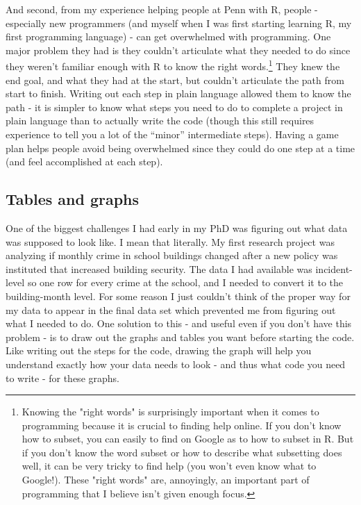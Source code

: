 \documentclass[
]{krantz}
\begin{document}
And second, from my experience helping people at Penn with R, people - especially new programmers (and myself when I was first starting learning R, my first programming language) - can get overwhelmed with programming. One major problem they had is they couldn't articulate what they needed to do since they weren't familiar enough with R to know the right words.\footnote{Knowing the "right words" is surprisingly important when it comes to programming because it is crucial to finding help online. If you don't know how to subset, you can easily to find on Google as to how to subset in R. But if you don't know the word subset or how to describe what subsetting does well, it can be very tricky to find help (you won't even know what to Google!). These "right words" are, annoyingly, an important part of programming that I believe isn't given enough focus.} They knew the end goal, and what they had at the start, but couldn't articulate the path from start to finish. Writing out each step in plain language allowed them to know the path - it is simpler to know what steps you need to do to complete a project in plain language than to actually write the code (though this still requires experience to tell you a lot of the ``minor'' intermediate steps). Having a game plan helps people avoid being overwhelmed since they could do one step at a time (and feel accomplished at each step).

\hypertarget{tables-and-graphs}{%
\subsection{Tables and graphs}\label{tables-and-graphs}}

One of the biggest challenges I had early in my PhD was figuring out what data was supposed to look like. I mean that literally. My first research project was analyzing if monthly crime in school buildings changed after a new policy was instituted that increased building security. The data I had available was incident-level so one row for every crime at the school, and I needed to convert it to the building-month level. For some reason I just couldn't think of the proper way for my data to appear in the final data set which prevented me from figuring out what I needed to do. One solution to this - and useful even if you don't have this problem - is to draw out the graphs and tables you want before starting the code. Like writing out the steps for the code, drawing the graph will help you understand exactly how your data needs to look - and thus what code you need to write - for these graphs.
\end{document}
